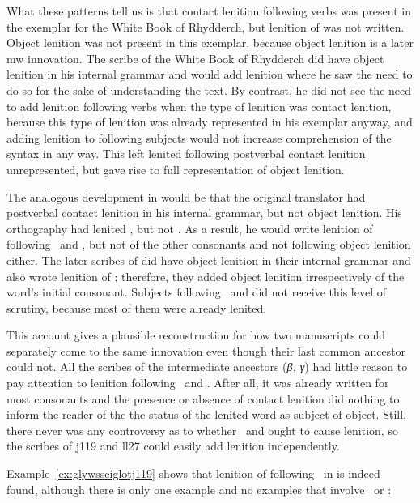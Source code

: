What these patterns tell us is that contact lenition following verbs was present in the exemplar for the White Book of Rhydderch, but lenition of  was not written. Object lenition was not present in this exemplar, because object lenition is a later \gls{mw} innovation. The scribe of the White Book of Rhydderch did have object lenition in his internal grammar and would add lenition where he saw the need to do so for the sake of understanding the text. By contrast, he did not see the need to add lenition following verbs when the type of lenition was contact lenition, because this type of lenition was already represented in his exemplar anyway, and adding lenition to following subjects would not increase comprehension of the syntax  in any way. This left lenited  following postverbal contact lenition unrepresented, but gave rise to full representation of object lenition.

The analogous development in  would be that the original translator had postverbal contact lenition in his internal grammar, but not object lenition. His orthography had lenited , but not . As a result, he would write lenition of  following \ei\ and , but not of the other consonants and not following object lenition either. The later scribes of  did have object lenition in their internal grammar and also wrote lenition of ; therefore, they added object lenition irrespectively of the word's initial consonant. Subjects following \ei\ and  did not receive this level of scrutiny, because most of them were already lenited.

This account gives a plausible reconstruction for how two manuscripts could separately come to the same innovation even though their last common ancestor could not. All the scribes of the intermediate ancestors (\textit{β, γ}) had little reason to pay attention to lenition following \ei\ and . After all, it was already written for most consonants and the presence or absence of contact lenition did nothing to inform the reader of the the status of the lenited word as subject of object. Still, there never was any controversy as to whether \ei\ and  ought to cause lenition, so the scribes of \gls{j119} and \gls{ll27} could easily add lenition independently.

Example~\ref{ex:glywsseiglotj119} shows that  lenition of  following \ei\ in  is indeed found, although there is only one example and no examples that involve \oes\ or :

